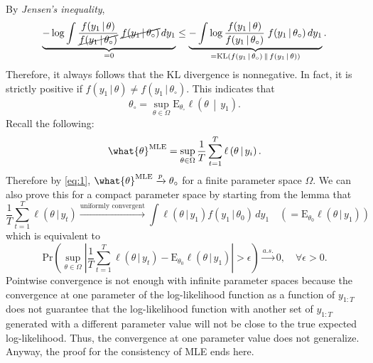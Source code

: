 \documentclass[answers]{exam}
\begin{document}
\begin{questions}
\begin{solution}
\begin{enumerate}[a)]
\begin{itemize}
\begin{align}
        \end{align}
        By \emph{Jensen's inequality},
        \begin{equation}
          \underbrace{-\log\int \dfrac{f(y_{1}\,|\,\theta)}{\cancel{f(y_{1}\,|\,\theta_{\circ})}}\; \cancel{f(y_{1}\,|\,\theta_{\circ})}\,dy_{1}}_{=0} \leq \underbrace{-\int \log \dfrac{f(y_{1}\,|\,\theta)}{f(y_{1}\,|\,\theta_{\circ})}\; f(y_{1}\,|\,\theta_{\circ})\,dy_{1}}_{=\mathrm{KL}\left(f(y_{1}\,|\,\theta_{\circ})\,\middle\|\,f(y_{1}\,|\,\theta)\right) }.
        \end{equation}
        Therefore, it always follows that the KL divergence is nonnegative. In fact, it is strictly positive if $f(y_{1}\,|\,\theta)\neq f(y_{1}\,|\,\theta_{\circ})$.
      This indicates that
      \begin{equation}
        \theta_{\circ} = \sup_{\theta\in\Omega}\mathrm{E}_{\theta_{\circ}}\ell\left(\theta\,\middle|\,y_{1}\right).
      \end{equation}
      Recall the following:
      \begin{equation}
        \what{\theta}^{\text{MLE}} = \sup_{\theta\in\Omega}\dfrac{1}{T}\sum_{t=1}^{T}\ell\left(\theta\,\middle|\,y_{i}\right).
      \end{equation}
      Therefore by \ref{eq:1}, $\what{\theta}^{\text{MLE}}\xrightarrow{p} \theta_{\circ}$ for a finite parameter space $\Omega$. We can also prove this for a compact parameter space by starting from the lemma that
      \begin{equation}
        \dfrac{1}{T}\sum_{t=1}^{T}\ell\left(\theta\,|\,y_{t}\right)\xrightarrow{\text{uniformly convergent}} \int \ell\left(\theta\,|\,y_{1}\right)f(y_{1}\,|\,\theta_{0})\,dy_{1}\quad \left(=\mathrm{E}_{\theta_{0}}\ell\left(\theta\,|\,y_{1}\right)\right)
      \end{equation}
      which is equivalent to
      \begin{equation}\label{almostSure}
        \mathrm{Pr}\left(\sup_{\theta\in\Omega}\left|\dfrac{1}{T}\sum_{t=1}^{T}\ell\left(\theta\,|\,y_{t}\right)-\mathrm{E}_{\theta_{0}}\ell\left(\theta\,|\,y_{1}\right)\right|>\epsilon\right)\xrightarrow{a.s.} 0,\quad \forall \epsilon >0.
      \end{equation}
      Pointwise convergence is not enough with infinite parameter spaces because the convergence at one parameter of the log-likelihood function as a function of $y_{1:T}$ does not guarantee that the log-likelihood function with another set of $y_{1:T}$ generated with a different parameter value will not be close to the true expected log-likelihood. Thus, the convergence at one parameter value does not generalize. Anyway, the proof for the consistency of MLE ends here.

\end{itemize}
\end{enumerate}
\end{solution}
\end{questions}
\end{document}
